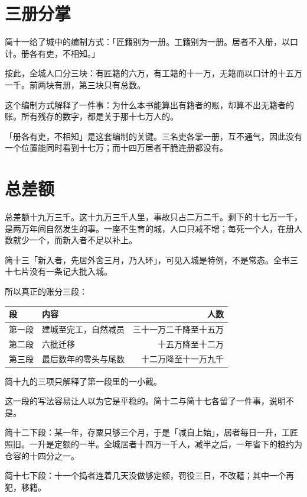 \section{三册分掌}

简十一给了城中的编制方式：「匠籍别为一册。工籍别为一册。居者不入册，以口计。册各有吏，不相知。」

按此，全城人口分三块：有匠籍的六万，有工籍的十一万，无籍而以口计的十五万一千。前两块有册，第三块只有总数。

这个编制方式解释了一件事：为什么本书能算出有籍者的账，却算不出无籍者的账。所有残存的数字，都是关于那十七万人的。

「册各有吏，不相知」是这套编制的关键。三名吏各掌一册，互不通气，因此没有一个位置能同时看到十七万；而十四万居者干脆连册都没有。

\section{总差额}

总差额十九万三千。这十九万三千人里，事故只占二万二千。剩下的十七万一千，是两万年间自然发生的事。一座不生育的城，人口只减不增；每死一个人，在册人数就少一个，而新入者不足以补上。

简十三「新入者，先居外舍三月，乃入环」，可见入城是特例，不是常态。全书三十七片没有一条记大批入城。

所以真正的账分三段：

\begin{center}
\small
\begin{tabular}{@{}llr@{}}
\toprule
段 & 内容 & 人数\\
\midrule
第一段 & 建城至完工，自然减员 & 三十一万二千降至十五万\\
第二段 & 六批迁移 & 十五万降至十二万\\
第三段 & 最后数年的零头与尾数 & 十二万降至十一万九千\\
\bottomrule
\end{tabular}
\end{center}

简十九的三项只解释了第一段里的一小截。

这一段的写法容易让人以为它是平稳的。简十二与简十七各留了一件事，说明不是。

简十二下段：某一年，存粟只够三个月，于是「减自上始」，居者每日一升，工匠照旧。一升是定额的一半。全城居者十四万一千人，减半之后，一年省下的粮约为仓容的十四分之一。

简十七下段：十一个捣者连着几天没做够定额，罚役三日，不改籍；其中一个再犯，移籍。


